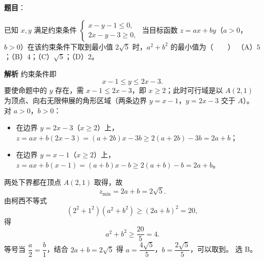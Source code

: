 \begin{answer}

\textbf{题目}：

已知 $x,y$ 满足约束条件 $\begin{cases}x-y-1\leqslant0,\\2x-y-3\geqslant0,\end{cases}$ 当目标函数 $z=ax+by$（$a>0$，$b>0$）在该约束条件下取到最小值 $2\sqrt5$ 时，$a^2+b^2$ 的最小值为\mbox{（　　）}
（A）$5$；（B）$4$；（C）$\sqrt5$；（D）$2$。

\textbf{解析}
约束条件即
\nopagebreak[4]
\[x-1\leqslant y\leqslant2x-3 .\]
要使命题中的 $y$ 存在，需 $x-1\leqslant2x-3$，即 $x\geqslant2$；此时可行域是以 $A(2,1)$ 为顶点、向右无限伸展的角形区域（两条边界 $y=x-1$，$y=2x-3$ 交于 $A$）。
对 $a>0$，$b>0$：
\begin{itemize}
\item 在边界 $y=2x-3$（$x\geqslant2$）上，$z=ax+b(2x-3)=(a+2b)x-3b\geqslant2(a+2b)-3b=2a+b$；
\item 在边界 $y=x-1$（$x\geqslant2$）上，$z=ax+b(x-1)=(a+b)x-b\geqslant2(a+b)-b=2a+b$。
\end{itemize}

两处下界都在顶点 $A(2,1)$ 取得，故
\nopagebreak[4]
\[z_{\min}=2a+b=2\sqrt5 .\]
由柯西不等式
\nopagebreak[4]
\[(2^2+1^2)(a^2+b^2)\geqslant(2a+b)^2=20,\]
得
\nopagebreak[4]
\[a^2+b^2\geqslant\frac{20}5=4 .\]
等号当 $\dfrac a2=\dfrac b1$，结合 $2a+b=2\sqrt5$ 得 $a=\dfrac{4\sqrt5}5$，$b=\dfrac{2\sqrt5}5$，可以取到。
选 B。


\end{answer}

